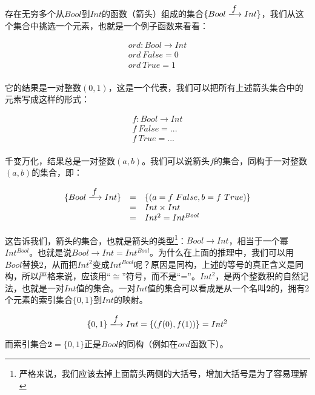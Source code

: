 \documentclass{article}
\begin{document}
\begin{example}
存在无穷多个从$Bool$到$Int$的函数（箭头）组成的集合$\{Bool \arrowto{f} Int\}$，我们从这个集合中挑选一个元素，也就是一个例子函数来看看：

\[
\begin{array}{l}
ord : Bool \to Int \\
ord\ False = 0 \\
ord\ True = 1 \\
\end{array}
\]

它的结果是一对整数$(0, 1)$，这是一个代表，我们可以把所有上述箭头集合中的元素写成这样的形式：

\[
\begin{array}{l}
f : Bool \to Int \\
f\ False = ... \\
f\ True = ... \\
\end{array}
\]

千变万化，结果总是一对整数$(a, b)$。我们可以说箭头$f$的集合，同构于一对整数$(a, b)$的集合，即：

\[
\begin{array}{rcl}
\{Bool \arrowto{f} Int\} & = & \{(a = f\ False, b = f\ True)\} \\
  & = & Int \times Int \\
  & = & Int^2 = Int^{Bool}
\end{array}
\]

这告诉我们，箭头的集合，也就是箭头的类型\footnote{严格来说，我们应该去掉上面箭头两侧的大括号，增加大括号是为了容易理解}：$Bool \to Int$，相当于一个幂$Int^{Bool}$。也就是说$Bool \to Int = Int^{Bool}$。为什么在上面的推理中，我们可以用$Bool$替换$2$，从而把$Int^2$变成$Int^{Bool}$呢？原因是同构，上述的等号的真正含义是同构，所以严格来说，应该用“$\cong$”符号，而不是“=”。$Int^2$，是两个整数积的自然记法，也就是一对$Int$值的集合。一对$Int$值的集合可以看成是从一个名叫\textbf{2}的，拥有2个元素的索引集合$\{0, 1\}$到$Int$的映射。

\[
\{0, 1\} \arrowto{f} Int = \{(f(0), f(1))\} = Int^2
\]

而索引集合$\mathbf{2} = \{0, 1\}$正是$Bool$的同构（例如在$ord$函数下）。
\end{example}
\end{document}
